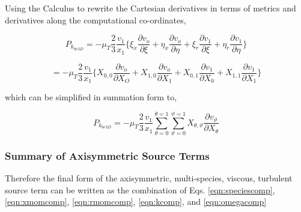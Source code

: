 	Using the Calculus to rewrite the Cartesian derivatives in terms of metrics and derivatives along the computational
co-ordinates,

\begin{displaymath}
	P_{k_{be3D}} = -\mu_T\frac{2}{3}\frac{v_1}{x_1}\Big\{\xi_x \frac{\partial v_o}{\partial \xi} +
	\eta_x \frac{\partial v_o}{\partial \eta} + \xi_r \frac{\partial v_1}{\partial \xi} + \eta_r
	\frac{\partial v_1}{\partial \eta}\Big\}
\end{displaymath}

\begin{displaymath}
	= -\mu_T\frac{2}{3}\frac{v_1}{x_1}\Big\{X_{0,0} \frac{\partial v_o}{\partial X_O} +
	X_{1,0} \frac{\partial v_o}{\partial X_1} + X_{0,1} \frac{\partial v_1}{\partial X_0} + X_{1,1}
	\frac{\partial v_1}{\partial X_1}\Big\}
\end{displaymath}

	which can be simplified in summation form to,

\begin{equation}
	P_{k_{be3D}}= -\mu_T\frac{2}{3}\frac{v_1}{x_1}\sum_{\theta=0}^{\theta=1}\sum_{\vartheta=0}^{\vartheta=1}
	X_{\theta,\vartheta}\frac{\partial v_{\vartheta}}{\partial X_{\theta}}
\label{eqn:pkbe3dtrans}
\end{equation}

\subsubsection{Summary of Axisymmetric Source Terms}

	Therefore the final form of the axisymmetric, multi-species, viscous, turbulent source term can be written as
the combination of Eqs. \ref{eqn:speciescomp}, \ref{eqn:xmomcomp}, \ref{eqn:rmomcomp}, \ref{eqn:kcomp}, and 
\ref{eqn:omegacomp} 
 
